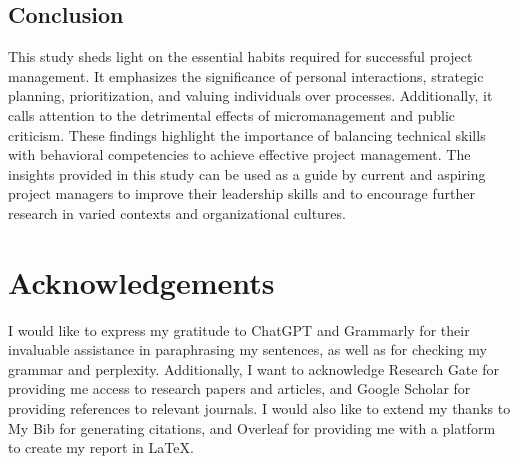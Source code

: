 \documentclass{article}
\begin{document}
\subsection{Conclusion}
This study sheds light on the essential habits required for successful project management. It emphasizes the significance of personal interactions, strategic planning, prioritization, and valuing individuals over processes. Additionally, it calls attention to the detrimental effects of micromanagement and public criticism. These findings highlight the importance of balancing technical skills with behavioral competencies to achieve effective project management. The insights provided in this study can be used as a guide by current and aspiring project managers to improve their leadership skills and to encourage further research in varied contexts and organizational cultures.

\newpage

\section*{Acknowledgements}
I would like to express my gratitude to ChatGPT and Grammarly for their invaluable assistance in paraphrasing my sentences, as well as for checking my grammar and perplexity. Additionally, I want to acknowledge Research Gate for providing me access to research papers and articles, and Google Scholar for providing references to relevant journals. I would also like to extend my thanks to My Bib for generating citations, and Overleaf for providing me with a platform to create my report in LaTeX.


\newpage
\end{document}
